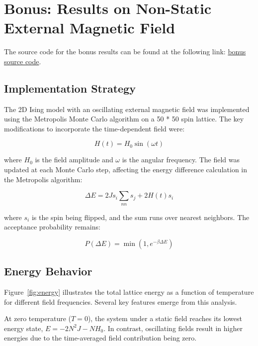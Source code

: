 \documentclass[11pt]{article}
\begin{document}
\section{Bonus: Results on Non-Static External Magnetic Field}\label{result2}

The source code for the bonus results can be found at the following link: 
\href{https://github.com/Salarscwise/simulation/tree/main/spin%20model%20variating%20H}{bonus source code}.




\subsection{Implementation Strategy}

The 2D Ising model with an oscillating external magnetic field was implemented using the Metropolis Monte Carlo algorithm on a 50 * 50 spin lattice. The key modifications to incorporate the time-dependent field were:

\begin{equation}
H(t) = H_0 \sin(\omega t)
\end{equation}

where $H_0$ is the field amplitude and $\omega$ is the angular frequency. The field was updated at each Monte Carlo step, affecting the energy difference calculation in the Metropolis algorithm:

\begin{equation}
\Delta E = 2J s_i \sum_{nn} s_j + 2H(t)s_i
\end{equation}

where $s_i$ is the spin being flipped, and the sum runs over nearest neighbors. The acceptance probability remains:

\begin{equation}
P(\Delta E) = \min(1, e^{-\beta \Delta E})
\end{equation}

\subsection{Energy Behavior}


Figure~\ref{fig:energy} illustrates the total lattice energy as a function of temperature for different field frequencies. Several key features emerge from this analysis. 

At zero temperature ($T=0$), the system under a static field reaches its lowest energy state, $E = -2N^2J - NH_0$. In contrast, oscillating fields result in higher energies due to the time-averaged field contribution being zero. 
\end{document}
